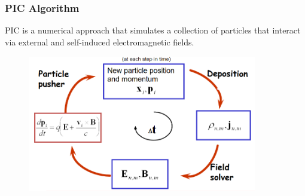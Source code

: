\documentclass{beamer}
\begin{document}
\begin{frame}
    \small
    \frametitle{PIC Algorithm}
    PIC is a numerical approach that simulates a collection of particles that interact via external and self-induced electromagnetic fields.
    \begin{figure}
        \includegraphics[width=10cm, height=6cm]{images/PIC.png}
        \centering
    \end{figure}

\end{frame}
\end{document}
